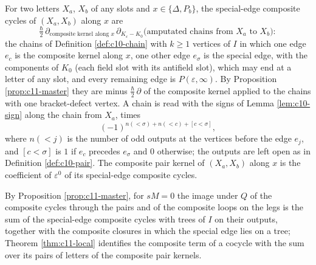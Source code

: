 \begin{definition}
\label{def:c11-sp}
For two letters $X_a$, $X_b$ of any slots and $x\in\{\Delta,P_b\}$, the special-edge composite cycles of $(X_a,X_b)$ along $x$ are
\[
\tfrac\hbar2\,\partial_{\text{composite kernel along }x}\,\partial_{K_\varepsilon-K_0}\big(\text{amputated chains from }X_a\text{ to }X_b\big):
\]
the chains of Definition \ref{def:c10-chain} with $k\ge1$ vertices of $I$ in which one edge $e_c$ is the composite kernel along $x$, one other edge $e_\sigma$ is the special edge, with the components of $K_0$ (each field slot with its antifield slot), which may end at a letter of any slot, and every remaining edge is $P(\varepsilon,\infty)$. By Proposition \ref{prop:c11-master} they are minus $\tfrac\hbar2\,\partial$ of the composite kernel applied to the chains with one bracket-defect vertex. A chain is read with the signs of Lemma \ref{lem:c10-sign} along the chain from $X_a$, times
\[
(-1)^{n(<\sigma)+n(<c)+[c<\sigma]},
\]
where $n(<j)$ is the number of odd outputs at the vertices before the edge $e_j$, and $[c<\sigma]$ is $1$ if $e_c$ precedes $e_\sigma$ and $0$ otherwise; the outputs are left open as in Definition \ref{def:c10-pair}. The composite pair kernel of $(X_a,X_b)$ along $x$ is the coefficient of $\varepsilon^0$ of its special-edge composite cycles.
\end{definition}

By Proposition \ref{prop:c11-master}, for $sM=0$ the image under $Q$ of the composite cycles through the pairs and of the composite loops on the legs is the sum of the special-edge composite cycles with trees of $I$ on their outputs, together with the composite closures in which the special edge lies on a tree; Theorem \ref{thm:c11-local} identifies the composite term of a cocycle with the sum over its pairs of letters of the composite pair kernels.

